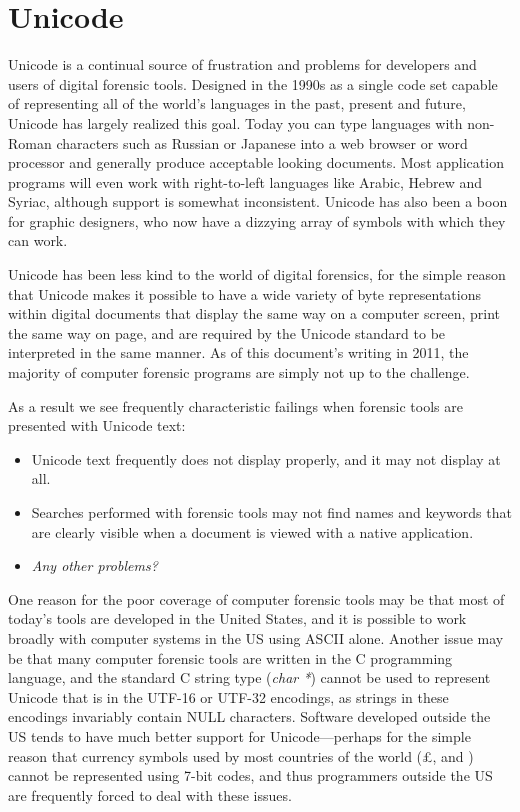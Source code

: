 \chapter{Unicode}
\label{chap:unicode}

Unicode is a continual source of frustration and problems for
developers and users of digital forensic tools. Designed in the 1990s
as a single code set capable of representing all of the world's
languages in the past, present and future, Unicode has largely
realized this goal. Today you can type languages with non-Roman
characters such as Russian or Japanese into a web browser or word
processor and generally produce acceptable looking documents. Most
application programs will even work with right-to-left languages like Arabic, 
Hebrew and Syriac, although support is somewhat inconsistent. Unicode
has also been a boon for graphic designers, who now have a dizzying
array of symbols with which they can work.

Unicode has been less kind to the world of digital forensics, for the
simple reason that Unicode makes it possible to have a wide variety of
byte representations within digital documents that display the same
way on a computer screen, print the same way on page, and are required
by the Unicode standard to be interpreted in the same manner.  As of
this document's writing in 2011, the majority of computer forensic
programs are simply not up to the challenge. 

As a result we see frequently characteristic failings when forensic
tools are presented with Unicode text:
\begin{itemize}
\item Unicode text frequently does not display properly, and it may
  not display at all.
\item Searches performed with forensic tools may not find names and
  keywords that are clearly 
  visible when a document is viewed with a native application.
\item \emph{Any other problems?}
\end{itemize}

One reason for the poor coverage of computer forensic tools may be
that most of today's tools are developed in the United States, and it
is possible to work broadly with computer systems in the US using
ASCII alone. Another issue may be that many computer forensic tools
are written in the C programming language, and the standard C string
type (\emph{char *}) cannot be used to represent Unicode that is in
the UTF-16 or UTF-32 encodings, as strings in these encodings invariably
contain NULL characters. Software developed outside the US tends to
have much better support for Unicode---perhaps for the simple reason
that currency symbols used by most countries of the world (\eg \pounds, \EURtm\xspace and \textyen)
cannot be represented using 7-bit codes, and thus programmers outside
the US are frequently forced to deal with these issues.

